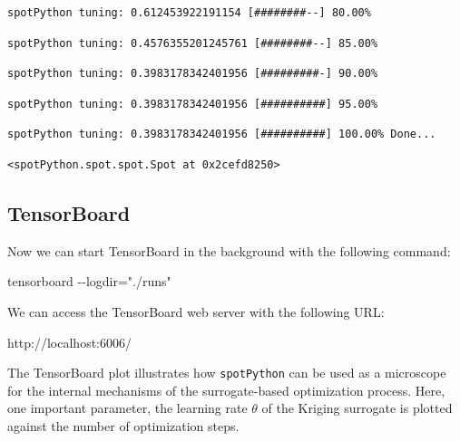 \documentclass[
  letterpaper,
  DIV=11,
  numbers=noendperiod]{scrreprt}
\newenvironment{Shaded}{\begin{snugshade}}{\end{snugshade}}
\newcommand{\NormalTok}[1]{\textcolor[rgb]{0.00,0.23,0.31}{#1}}
\begin{document}
\begin{verbatim}
spotPython tuning: 0.612453922191154 [########--] 80.00% 
\end{verbatim}

\begin{verbatim}
spotPython tuning: 0.4576355201245761 [########--] 85.00% 
\end{verbatim}

\begin{verbatim}
spotPython tuning: 0.3983178342401956 [#########-] 90.00% 
\end{verbatim}

\begin{verbatim}
spotPython tuning: 0.3983178342401956 [##########] 95.00% 
\end{verbatim}

\begin{verbatim}
spotPython tuning: 0.3983178342401956 [##########] 100.00% Done...
\end{verbatim}

\begin{verbatim}
<spotPython.spot.spot.Spot at 0x2cefd8250>
\end{verbatim}

\hypertarget{tensorboard-7}{%
\subsection{TensorBoard}\label{tensorboard-7}}

Now we can start TensorBoard in the background with the following
command:

\begin{Shaded}
\begin{Highlighting}[]
\NormalTok{tensorboard {-}{-}logdir="./runs"}
\end{Highlighting}
\end{Shaded}

We can access the TensorBoard web server with the following URL:

\begin{Shaded}
\begin{Highlighting}[]
\NormalTok{http://localhost:6006/}
\end{Highlighting}
\end{Shaded}

The TensorBoard plot illustrates how \texttt{spotPython} can be used as
a microscope for the internal mechanisms of the surrogate-based
optimization process. Here, one important parameter, the learning rate
\(\theta\) of the Kriging surrogate is plotted against the number of
optimization steps.
\end{document}
